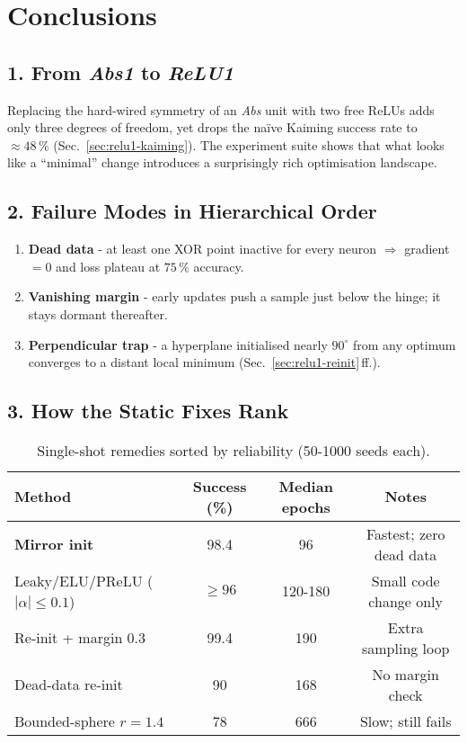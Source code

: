\section{Conclusions}
\label{sec:relu1-conclusions}

\subsection*{1.  From \textit{Abs1} to \textit{ReLU1}}
Replacing the hard-wired symmetry of an \emph{Abs} unit with two free
ReLUs adds only three degrees of freedom, yet drops the naïve Kaiming
success rate to $\approx 48\,\%$ (Sec.~\ref{sec:relu1-kaiming}).  
The experiment suite shows that what looks like a “minimal” change
introduces a surprisingly rich optimisation landscape.

\subsection*{2.  Failure Modes in Hierarchical Order}
\begin{enumerate}[label=(F\arabic*)]
  \item \textbf{Dead data} - at least one XOR point inactive for every
        neuron \(\Rightarrow\) gradient $=0$ and loss plateau at
        $75\,\%$ accuracy.
  \item \textbf{Vanishing margin} - early updates push a sample just
        below the hinge; it stays dormant thereafter.
  \item \textbf{Perpendicular trap} - a hyperplane initialised nearly
        $90^{\circ}$ from any optimum converges to a distant local
        minimum (Sec.~\ref{sec:relu1-reinit}\,ff.).
\end{enumerate}

\subsection*{3.  How the Static Fixes Rank}
\begin{table}[h]
\centering
\caption{Single-shot remedies sorted by reliability (50-1000 seeds each).}
\label{tab:relu1-static-summary}
\begin{tabular}{lccc}
\toprule
Method & Success (\%) & Median epochs & Notes\\
\midrule
\textbf{Mirror init} & 98.4 & 96 & Fastest; zero dead data\\
Leaky/ELU/PReLU ($|\alpha|\!\le\!0.1$) & $\ge96$ & 120-180 & Small code change only\\
Re-init + margin 0.3 & 99.4 & 190 & Extra sampling loop\\
Dead-data re-init & 90 & 168 & No margin check\\
Bounded-sphere $r=1.4$ & 78 & 666 & Slow; still fails\\
\bottomrule
\end{tabular}
\end{table}

